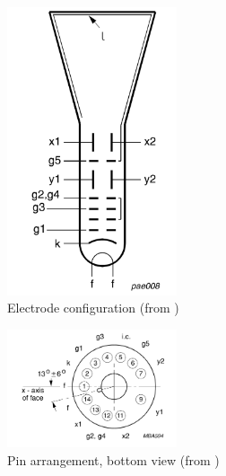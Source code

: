\begin{figure}[h]
	\centering
	\includegraphics[width=5cm]{./Chapters/e-beam-setup/electrode configuration}
	\caption{Electrode configuration (from \autocite{D14363GY123-manual})}
	\label{fig:electrode configuration}
\end{figure}

\begin{figure}[h]
	\centering
	\includegraphics[width=5cm]{./Chapters/e-beam-setup/pin arrangement}
	\caption{Pin arrangement, bottom view (from \autocite{D14363GY123-manual})}
	\label{fig:pin arrangement}
\end{figure}


